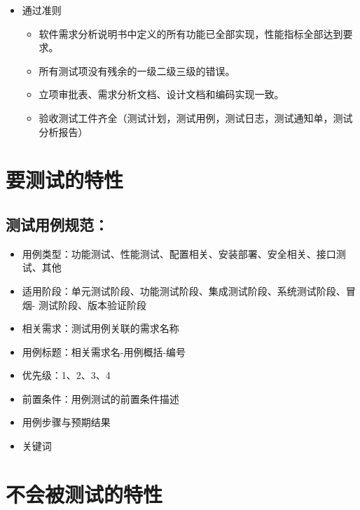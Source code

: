\documentclass[hyperref, a4paper]{ctexart}
\providecommand{\tightlist}{%
  \setlength{\itemsep}{0pt}\setlength{\parskip}{0pt}}
\begin{document}
\begin{itemize}
  \begin{itemize}
  \tightlist
  \item
    通过准则

    \begin{itemize}
    \tightlist
    \item
      软件需求分析说明书中定义的所有功能已全部实现，性能指标全部达到要求。
    \item
      所有测试项没有残余的一级二级三级的错误。
    \item
      立项审批表、需求分析文档、设计文档和编码实现一致。
    \item
      验收测试工件齐全（测试计划，测试用例，测试日志，测试通知单，测试分析报告）
    \end{itemize}
  \end{itemize}
\end{itemize}

\hypertarget{ux8981ux6d4bux8bd5ux7684ux7279ux6027}{%
\section{要测试的特性}\label{ux8981ux6d4bux8bd5ux7684ux7279ux6027}}

\hypertarget{ux6d4bux8bd5ux7528ux4f8bux89c4ux8303}{%
\subsection{测试用例规范：}\label{ux6d4bux8bd5ux7528ux4f8bux89c4ux8303}}

\begin{itemize}
\tightlist
\item
  用例类型：功能测试、性能测试、配置相关、安装部署、安全相关、接口测试、其他
\item
  适用阶段：单元测试阶段、功能测试阶段、集成测试阶段、系统测试阶段、冒烟-
  测试阶段、版本验证阶段
\item
  相关需求：测试用例关联的需求名称
\item
  用例标题：相关需求名-用例概括-编号
\item
  优先级：1、2、3、4
\item
  前置条件：用例测试的前置条件描述
\item
  用例步骤与预期结果
\item
  关键词
\end{itemize}

\hypertarget{ux4e0dux4f1aux88abux6d4bux8bd5ux7684ux7279ux6027}{%
\section{不会被测试的特性}\label{ux4e0dux4f1aux88abux6d4bux8bd5ux7684ux7279ux6027}}
\end{document}
